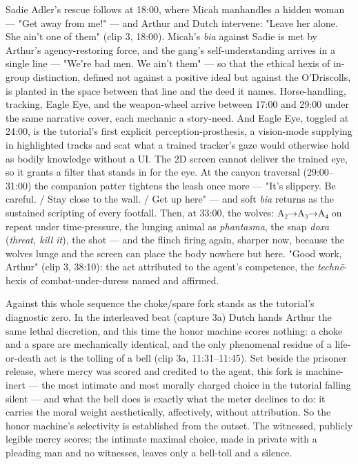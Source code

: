 \documentclass{article}
\begin{document}
Sadie Adler's rescue follows at 18:00, where Micah manhandles a hidden woman — "Get away from me!" — and Arthur and Dutch intervene: "Leave her alone. She ain't one of them" (clip 3, 18:00). Micah's \textit{bia} against Sadie is met by Arthur's agency-restoring force, and the gang's self-understanding arrives in a single line — "We're bad men. We ain't them" — so that the ethical hexis of in-group distinction, defined not against a positive ideal but against the O'Driscolls, is planted in the space between that line and the deed it names. Horse-handling, tracking, Eagle Eye, and the weapon-wheel arrive between 17:00 and 29:00 under the same narrative cover, each mechanic a story-need. And Eagle Eye, toggled at 24:00, is the tutorial's first explicit perception-prosthesis, a vision-mode supplying in highlighted tracks and scat what a trained tracker's gaze would otherwise hold as bodily knowledge without a UI. The 2D screen cannot deliver the trained eye, so it grants a filter that stands in for the eye. At the canyon traversal (29:00–31:00) the companion patter tightens the leash once more — "It's slippery. Be careful. / Stay close to the wall. / Get up here" — and soft \textit{bia} returns as the sustained scripting of every footfall. Then, at 33:00, the wolves: A₂→A₃→A₄ on repeat under time-pressure, the lunging animal as \textit{phantasma}, the snap \textit{doxa} (\textit{threat, kill it}), the shot — and the flinch firing again, sharper now, because the wolves lunge and the screen can place the body nowhere but here. "Good work, Arthur" (clip 3, 38:10): the act attributed to the agent's competence, the \textit{technē}-hexis of combat-under-duress named and affirmed.

Against this whole sequence the choke/spare fork stands as the tutorial's diagnostic zero. In the interleaved beat (capture 3a) Dutch hands Arthur the same lethal discretion, and this time the honor machine scores nothing: a choke and a spare are mechanically identical, and the only phenomenal residue of a life-or-death act is the tolling of a bell (clip 3a, 11:31–11:45). Set beside the prisoner release, where mercy was scored and credited to the agent, this fork is machine-inert — the most intimate and most morally charged choice in the tutorial falling silent — and what the bell does is exactly what the meter declines to do: it carries the moral weight aesthetically, affectively, without attribution. So the honor machine's selectivity is established from the outset. The witnessed, publicly legible mercy scores; the intimate maximal choice, made in private with a pleading man and no witnesses, leaves only a bell-toll and a silence.
\end{document}
